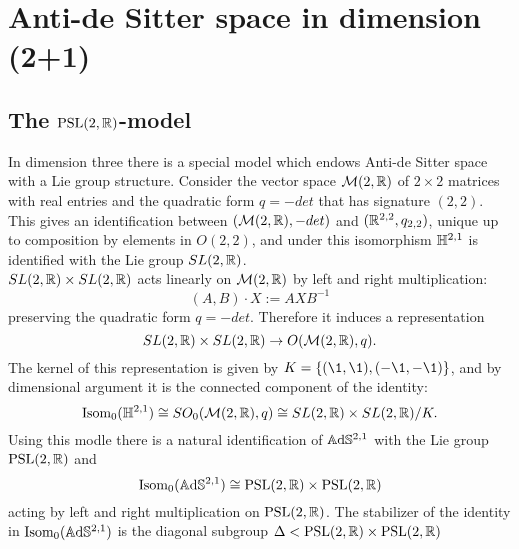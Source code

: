 \chapter{Anti-de Sitter space in dimension (2+1)}

\section{The $\text{PSL}(2,\mathbb{R})$-model}
In dimension three there is a special model which endows Anti-de Sitter space with a Lie group structure.
Consider the vector space $\mathcal{M}(2,\mathbb{R})$ of $2 \times 2$ matrices with real entries and the quadratic form $q= -det$ that has signature $(2,2)$.
This gives an identification between $(\mathcal{M}(2,\mathbb{R}), -det)$ and $(\mathbb{R}^{2,2},q_{2,2})$, unique up to composition by elements in $O(2,2)$, and under this isomorphism $\mathbb{H}^{2,1}$ is identified with the Lie group $SL(2,\mathbb{R})$.\\
$SL(2,\mathbb{R})\times SL(2,\mathbb{R})$ acts linearly on $\mathcal{M}(2,\mathbb{R})$ by left and right multiplication:
\[
    (A,B) \cdot X := AXB^{-1}    
\]
preserving the quadratic form $q = -det$. Therefore it induces a representation
\[
    SL(2,\mathbb{R})\times SL(2,\mathbb{R}) \to O(\mathcal{M}(2,\mathbb{R}),q).
\]
The kernel of this representation is given by $K=\{ (\1,\1),(-\1,-\1) \}$, and by dimensional argument it is the connected component of the identity:
\[
    \text{Isom}_0(\mathbb{H}^{2,1}) \cong SO_0(\mathcal{M}(2,\mathbb{R}),q) \cong SL(2,\mathbb{R})\times SL(2,\mathbb{R}) / K.
\]
Using this modle there is a natural identification of $\mathbb{A}\mathrm{d}\mathbb{S}^{2,1}$ with the Lie group $\text{PSL}(2,\mathbb{R})$ and
\[
    \text{Isom}_0(\mathbb{A}\mathrm{d}\mathbb{S}^{2,1}) \cong \text{PSL}(2,\mathbb{R}) \times \text{PSL}(2,\mathbb{R})
\]
acting by left and right multiplication on $\text{PSL}(2,\mathbb{R})$.
The stabilizer of the identity in $\text{Isom}_0(\mathbb{A}\mathrm{d}\mathbb{S}^{2,1})$ is the diagonal subgroup $\Delta < \text{PSL}(2,\mathbb{R}) \times \text{PSL}(2,\mathbb{R})$\\

